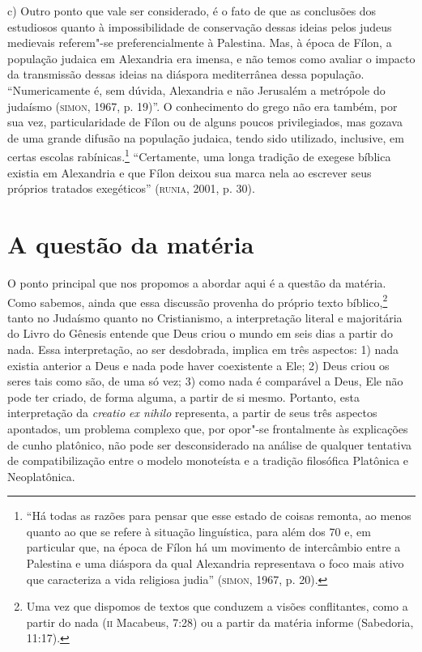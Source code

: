 c) Outro ponto que vale ser considerado, é o fato de que as conclusões
dos estudiosos quanto à impossibilidade de conservação dessas ideias
pelos judeus medievais referem"-se preferencialmente à Palestina. Mas,
à época de Fílon, a população judaica em Alexandria era imensa, e não
temos como avaliar o impacto da transmissão dessas ideias na diáspora
mediterrânea dessa população. “Numericamente é, sem dúvida,
Alexandria e não Jerusalém a metrópole do judaísmo (\textsc{simon}, 1967, p.
19)”. O conhecimento do grego não era também, por sua vez,
particularidade de Fílon ou de alguns poucos privilegiados, mas
gozava de uma grande difusão na população judaica, tendo sido
utilizado, inclusive, em certas escolas rabínicas.\footnote{ “Há todas
as razões para pensar que esse estado de coisas remonta, ao menos
quanto ao que se refere à situação linguística, para além dos 70 e,
em particular que, na época de Fílon há um movimento de intercâmbio
entre a Palestina e uma diáspora da qual Alexandria representava o
foco mais ativo que caracteriza a vida religiosa judia”
(\textsc{simon}, 1967,
p. 20).} “Certamente, uma longa tradição de exegese bíblica existia
em Alexandria e que Fílon deixou sua marca nela ao escrever seus
próprios tratados exegéticos” (\textsc{runia}, 2001, p. 30).

\section{A questão da matéria}

O ponto principal que nos propomos a abordar aqui é a questão da
matéria. Como sabemos, ainda que essa discussão provenha do próprio
texto bíblico,\footnote{ Uma vez que dispomos de textos que conduzem a
visões conflitantes, como a partir do nada (\textsc{ii} Macabeus, 7:28) ou  a
partir da matéria informe (Sabedoria, 11:17).} tanto no Judaísmo
quanto no Cristianismo, a interpretação literal e majoritária do
Livro do Gênesis entende que Deus criou o mundo em seis dias a partir
do nada. Essa interpretação, ao ser desdobrada, implica em três
aspectos: 1) nada existia anterior a Deus e nada pode haver
coexistente a Ele; 2) Deus criou os seres tais como são, de uma só
vez; 3) como nada é comparável a Deus, Ele não pode ter criado, de
forma alguma, a partir de si mesmo. Portanto, esta interpretação da
\emph{creatio} \emph{ex nihilo} representa, a partir de seus três
aspectos apontados, um problema complexo que, por opor"-se
frontalmente às explicações de cunho platônico, não pode ser
desconsiderado na análise de qualquer tentativa de compatibilização
entre o modelo monoteísta e a tradição filosófica Platônica e
Neoplatônica. 

